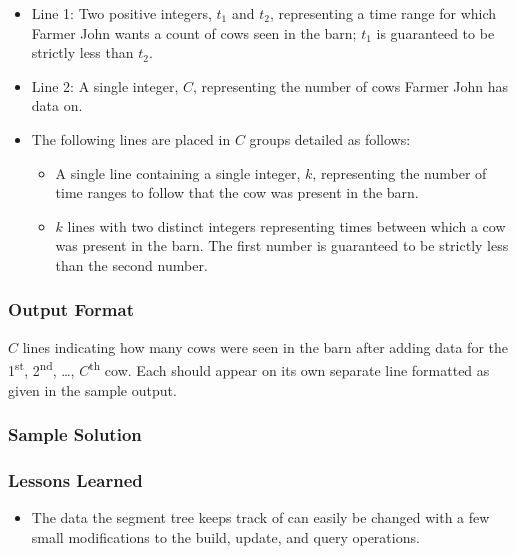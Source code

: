\begin{itemize}
    \item Line 1: Two positive integers, $t_1$ and $t_2$, representing a time range for which Farmer John wants a count of cows seen in the barn; $t_1$ is guaranteed to be strictly less than $t_2$.

    \item Line 2: A single integer, $C$, representing the number of cows Farmer John has data on.

    \item The following lines are placed in $C$ groups detailed as follows:
    \begin{itemize}
        \item A single line containing a single integer, $k$, representing the number of time ranges to follow that the cow was present in the barn.

        \item $k$ lines with two distinct integers representing times between which a cow was present in the barn.
        The first number is guaranteed to be strictly less than the second number.
    \end{itemize}
\end{itemize}


\subsubsection{Output Format}

$C$ lines indicating how many cows were seen in the barn after adding data for the 1\textsuperscript{st}, 2\textsuperscript{nd}, \ldots, $C$\textsuperscript{th} cow.
Each should appear on its own separate line formatted as given in the sample output.


\subsubsection{Sample Solution}




\subsubsection{Lessons Learned}

\begin{itemize}
    \item The data the segment tree keeps track of can easily be changed with a few small modifications to the build, update, and query operations.
\end{itemize}

